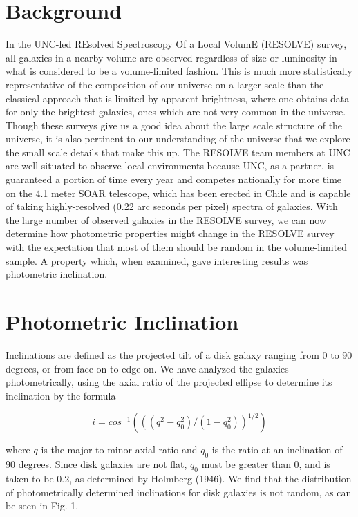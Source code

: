 \documentclass{emulateapj}
\begin{document}
\section{Background}

In the UNC-led REsolved Spectroscopy Of a Local VolumE (RESOLVE) survey, all galaxies in a nearby volume are observed regardless of size or luminosity in what is considered to be a volume-limited fashion. This is much more statistically representative of the composition of our universe on a larger scale than the classical approach that is limited by apparent brightness, where one obtains data for only the brightest galaxies, ones which are not very common in the universe. Though these surveys give us a good idea about the large scale structure of the universe, it is also pertinent to our understanding of the universe that we explore the small scale details that make this up. The RESOLVE team members at UNC are well-situated to observe local environments because UNC, as a partner, is guaranteed a portion of time every year and competes nationally for more time on the 4.1 meter SOAR telescope, which has been erected in Chile and is capable of taking highly-resolved (0.22 arc seconds per pixel) spectra of galaxies. With the large number of observed galaxies in the RESOLVE survey, we can now determine how photometric properties might change in the RESOLVE survey with the expectation that most of them should be random in the volume-limited sample. A property which, when examined, gave interesting results was photometric inclination.

\section{Photometric Inclination}

Inclinations are defined as the projected tilt of a disk galaxy ranging from 0 to 90 degrees, or from face-on to edge-on. We have analyzed the galaxies photometrically, using the axial ratio of the projected ellipse to determine its inclination by the formula

\begin{equation}
i = cos^{-1}(((q^2-q_0^2)/(1-q_0^2))^{1/2})
\end{equation}

where $q$ is the major to minor axial ratio and $q_0$ is the ratio at an inclination of 90 degrees. Since disk galaxies are not flat, $q_0$ must be greater than 0, and is taken to be 0.2, as determined by Holmberg (1946). We find that the distribution of photometrically determined inclinations for disk galaxies is not random, as can be seen in Fig. 1.
\end{document}

